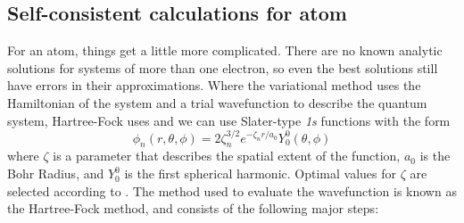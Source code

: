 \documentclass[journal=jacsat,manuscript=communication]{achemso}
\begin{document}
\subsection{Self-consistent calculations for  atom}
For an  atom, things get a little more complicated.  There are no known analytic solutions for systems of more than one electron, so even the best solutions still have errors in their approximations.  Where the variational method uses the Hamiltonian of the system and a trial wavefunction to describe the quantum system, Hartree-Fock uses  and we can use Slater-type \textit{1s} functions with the form 
\begin{equation}
	\phi_n(r,\theta,\phi) = 2\zeta_n^{3/2}e^{-\zeta_nr/a_0}Y_0^0(\theta,\phi)
\end{equation}
where $\zeta$ is a parameter that describes the spatial extent of the function, $a_0$ is the Bohr Radius, and $Y_0^0$ is the first spherical harmonic.  Optimal values for $\zeta$ are selected according to \citet{roettiSimpleBasisSets1974}.  The method used to evaluate the wavefunction is known as the Hartree-Fock method, and consists of the following major steps:
\end{document}
